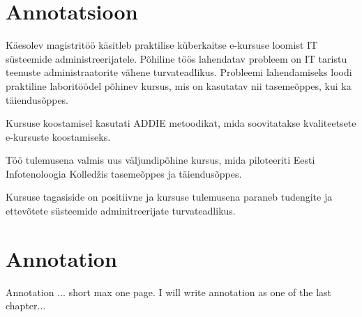 \clearpage
\chapter*{Annotatsioon}
\label{annotatsioon}
\thispagestyle{empty}

Käesolev magistritöö käsitleb praktilise küberkaitse e-kursuse loomist IT süsteemide administreerijatele. Põhiline töös lahendatav probleem on IT taristu teenuste administraatorite vähene turvateadlikus. Probleemi lahendamiseks loodi praktiline laboritöödel põhinev kursus, mis on kasutatav nii tasemeõppes, kui ka täiendusõppes.

Kursuse koostamisel kasutati \gls{ADDIE} metoodikat, mida soovitatakse kvaliteetsete e-kursuste koostamiseks.

Töö tulemusena valmis uus väljundipõhine kursus, mida piloteeriti Eesti Infotenoloogia Kolledžis tasemeõppes ja täiendusõppes.

Kursuse tagasiside on positiivne ja kursuse tulemusena paraneb tudengite ja ettevõtete süsteemide adminitreerijate turvateadlikus.

\clearpage
\chapter*{Annotation}
\label{annotation}
\thispagestyle{empty}


Annotation ... short max one page. I will write annotation as one of the last chapter...
